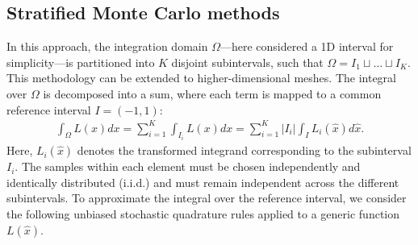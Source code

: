 \documentclass{article}
\theoremstyle{definition}
\begin{document}
\subsection{Stratified Monte Carlo methods}
In this approach, the integration domain $\Omega$—here considered a 1D interval for simplicity—is partitioned into $K$ disjoint subintervals, such that $\Omega = I_1 \sqcup \dots \sqcup I_K$. This methodology can be extended to higher-dimensional meshes. The integral over $\Omega$ is decomposed into a sum, where each term is mapped to a common reference interval $I=(-1,1)$:
\begin{align*}
    \int_\Omega L(x) dx  = \sum_{i=1}^K \int_{I_i} L(x) dx  = \sum_{i=1}^K |I_i| \int_{I} L_i(\hat{x}) d\hat{x}.
\end{align*}
Here, $L_i(\hat{x})$ denotes the transformed integrand corresponding to the subinterval $I_i$. The samples within each element must be chosen independently and identically distributed (i.i.d.) and must remain independent across the different subintervals. To approximate the integral over the reference interval, we consider the following unbiased stochastic quadrature rules applied to a generic function $L(\hat{x})$.

\end{document}
